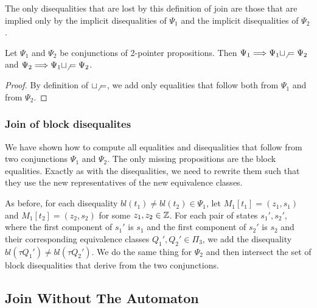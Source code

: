 The only disequalities that are lost by this definition of join are those that are implied only by the implicit disequalities of $\Psi_1$ and the implicit disequalities of $\Psi_2$.

\begin{proposition}
    Let $\Psi_1$ and $\Psi_2$ be conjunctions of 2-pointer propositions.
    Then $\Psi_1 \Longrightarrow \Psi_1 \sqcup_\neq \Psi_2$ and $\Psi_2 \Longrightarrow \Psi_1 \sqcup_\neq \Psi_2$.
\end{proposition}

\begin{proof}
    By definition of $\sqcup_\neq$, we add only equalities that follow both from $\Psi_1$ and from $\Psi_2$.
\end{proof}

\subsubsection{Join of block disequalites}
We have shown how to compute all equalities and disequalities that follow from two conjunctions $\Psi_1$ and $\Psi_2$.
The only missing propositions are the block equalities.
Exactly as with the disequalities, we need to rewrite them such that they use the new representatives of the new equivalence classes.

As before, for each disequality $bl(t_1) \neq bl(t_2) \in \Psi_1$, let $M_1[t_1] = (z_1, s_1)$ and $M_1[t_2] = (z_2, s_2)$ for some $z_1,z_2\in \mathbb{Z}$.
For each pair of states $s_1', s_2'$, where the first component of $s_1'$ is $s_1$ and the first component of $s_2'$ is $s_2$ and their corresponding equivalence classes $Q_1', Q_2' \in \Pi_3$, we add the disequality $bl(\tau Q_1') \neq bl(\tau Q_2')$.
We do the same thing for $\Psi_2$ and then intersect the set of block disequalities that derive from the two conjunctions.

\subsection{Join Without The Automaton}
